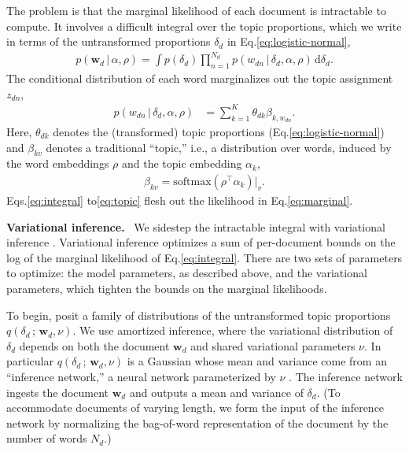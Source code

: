 \documentclass[11pt,a4paper]{article}
\DeclareRobustCommand{\parhead}[1]{\noindent\textbf{#1}~}
\newcommand{\g}{\, | \,}
\newcommand{\prm}{\, ; \,}
\newcommand{\bw}{\mathbf{w}}
\newcommand{\dd}{\, \mathrm{d}}
\begin{document}
The problem is that the marginal likelihood of each document is
intractable to compute.  It involves a difficult integral over the
topic proportions, which we write in terms of the untransformed
proportions $\delta_d$ in Eq.\nobreakspace \ref {eq:logistic-normal},
\begin{align}
  \label{eq:integral}
  p(\bw_d \g \alpha, \rho) =
  \int p(\delta_d)
  \prod_{n=1}^{N_d}
  p(w_{dn} \g \delta_d, \alpha, \rho) \dd \delta_d.
\end{align}
The conditional distribution of each word marginalizes out the topic
assignment $z_{dn}$,
\begin{align}
  \label{eq:likelihood}
  p(w_{dn} \g \delta_d, \alpha, \rho)
  &= \sum_{k=1}^{K} \theta_{dk} \beta_{k,w_{dn}}.
\end{align}
Here, $\theta_{dk}$ denotes the (transformed) topic proportions
(Eq.\nobreakspace \ref {eq:logistic-normal}) and $\beta_{kv}$ denotes a traditional
``topic,'' i.e., a distribution over words, induced by the word embeddings
$\rho$ and the topic embedding $\alpha_k$,
\begin{align}
  \label{eq:topic}
  \beta_{kv} = \textrm{softmax}(\rho^\top \alpha_k)\big|_v.
\end{align}
Eqs.\nobreakspace  \ref {eq:integral} to\nobreakspace  \ref {eq:topic}  flesh out the likelihood in
Eq.\nobreakspace \ref {eq:marginal}.

\parhead{Variational inference.} We sidestep the intractable integral
with variational inference \citep{Jordan1999,Blei2017}. Variational
inference optimizes a sum of per-document bounds on the log of the
marginal likelihood of Eq.\nobreakspace \ref {eq:integral}.  There are two sets of
parameters to optimize: the model parameters, as described above, and
the variational parameters, which tighten the bounds on the marginal
likelihoods.

To begin, posit a family of distributions of the untransformed topic
proportions $q(\delta_d\prm \bw_d, \nu)$.  We use amortized
inference, where the variational distribution of $\delta_d$ depends on
both the document $\bw_d$ and shared variational parameters $\nu$.  In
particular $q(\delta_d\prm \bw_d, \nu)$ is a Gaussian whose mean and
variance come from an ``inference network,'' a neural network
parameterized by $\nu$ \citep{kingma2014autoencoding}.
The inference network ingests the document $\bw_d$ and outputs a
mean and variance of $\delta_d$. (To accommodate documents of varying
length, we form the input of the inference network by normalizing the
bag-of-word representation of the document by the number of words $N_d$.)
\end{document}
